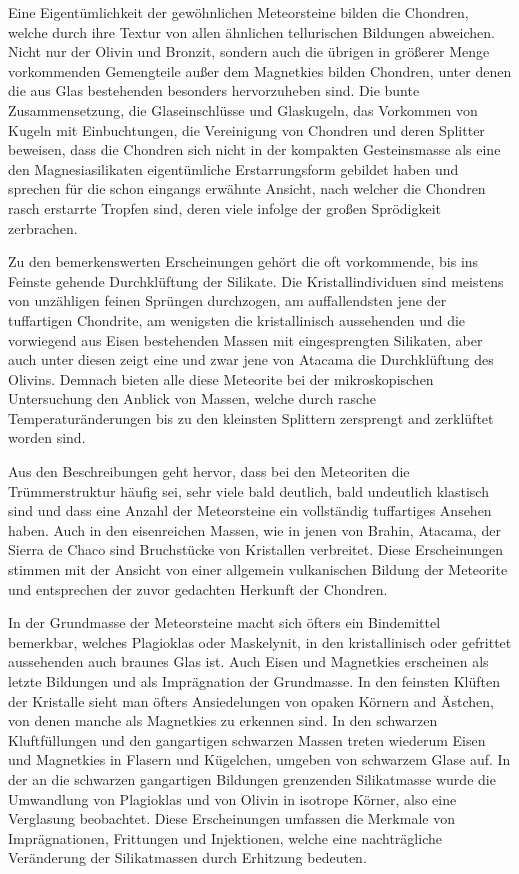 \documentclass[a4paper, 12pt, oneside]{article}
\begin{document}
Eine Eigentümlichkeit der gewöhnlichen Meteorsteine bilden die Chondren, welche durch ihre Textur von allen ähnlichen tellurischen Bildungen abweichen. Nicht nur der Olivin und Bronzit, sondern auch die übrigen in größerer Menge vorkommenden Gemengteile außer dem Magnetkies bilden Chondren, unter denen die aus Glas bestehenden besonders hervorzuheben sind. Die bunte Zusammensetzung, die Glaseinschlüsse und Glaskugeln, das Vorkommen von Kugeln mit Einbuchtungen, die Vereinigung von Chondren und deren Splitter beweisen, dass die Chondren sich nicht in der kompakten Gesteinsmasse als eine den Magnesiasilikaten eigentümliche Erstarrungsform gebildet haben und sprechen für die schon eingangs erwähnte Ansicht, nach welcher die Chondren rasch erstarrte Tropfen sind, deren viele infolge der großen Sprödigkeit zerbrachen.

Zu den bemerkenswerten Erscheinungen gehört die oft vorkommende, bis ins Feinste gehende Durchklüftung der Silikate. Die Kristallindividuen sind meistens von unzähligen feinen Sprüngen durchzogen, am auffallendsten jene der tuffartigen Chondrite, am wenigsten die kristallinisch aussehenden und die vorwiegend aus Eisen bestehenden Massen mit eingesprengten Silikaten, aber auch unter diesen zeigt eine und zwar jene von Atacama die Durchklüftung des Olivins. Demnach bieten alle diese Meteorite bei der mikroskopischen Untersuchung den Anblick von Massen, welche durch rasche Temperaturänderungen bis zu den kleinsten Splittern zersprengt and zerklüftet worden sind.

Aus den Beschreibungen geht hervor, dass bei den Meteoriten die Trümmerstruktur häufig sei, sehr viele bald deutlich, bald undeutlich klastisch sind und dass eine Anzahl der Meteorsteine ein vollständig tuffartiges Ansehen haben. Auch in den eisenreichen Massen, wie in jenen von Brahin, Atacama, der Sierra de Chaco sind Bruchstücke von Kristallen verbreitet. Diese Erscheinungen stimmen mit der Ansicht von einer allgemein vulkanischen Bildung der Meteorite und entsprechen der zuvor gedachten Herkunft der Chondren.

In der Grundmasse der Meteorsteine macht sich öfters ein Bindemittel bemerkbar, welches Plagioklas oder Maskelynit, in den kristallinisch oder gefrittet aussehenden auch braunes Glas ist. Auch Eisen und Magnetkies erscheinen als letzte Bildungen und als Imprägnation der Grundmasse. In den feinsten Klüften der Kristalle sieht man öfters Ansiedelungen von opaken Körnern and Ästchen, von denen manche als Magnetkies zu erkennen sind. In den schwarzen Kluftfüllungen und den gangartigen schwarzen Massen treten wiederum Eisen und Magnetkies in Flasern und Kügelchen, umgeben von schwarzem Glase auf. In der an die schwarzen gangartigen Bildungen grenzenden Silikatmasse wurde die Umwandlung von Plagioklas und von Olivin in isotrope Körner, also eine Verglasung beobachtet. Diese Erscheinungen umfassen die Merkmale von Imprägnationen, Frittungen und Injektionen, welche eine nachträgliche Veränderung der Silikatmassen durch Erhitzung bedeuten.
\end{document}
